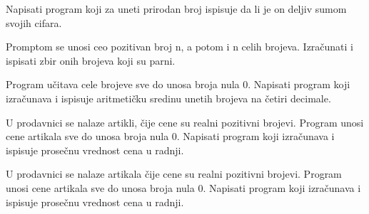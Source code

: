 \begin{primer}
Napisati program koji za uneti prirodan broj ispisuje da li
je on deljiv sumom svojih cifara.
\end{primer}

\begin{primer}
Promptom se unosi ceo pozitivan broj n, a potom i n celih
brojeva. Izračunati i ispisati zbir onih brojeva koji su parni.
\end{primer}

\begin{primer}
Program učitava cele brojeve sve do unosa broja nula 0.
Napisati program koji izračunava i ispisuje aritmetičku sredinu unetih brojeva na
četiri decimale.
\end{primer}

\begin{primer}
U prodavnici se nalaze artikli, čije cene su realni pozitivni
brojevi. Program unosi cene artikala sve do unosa broja nula 0. Napisati program
koji izračunava i ispisuje prosečnu vrednost cena u radnji.
\end{primer}

\begin{primer}
U prodavnici se nalaze artikala čije cene su realni pozitivni
brojevi. Program unosi cene artikala sve do unosa broja nula 0. Napisati program
koji izračunava i ispisuje prosečnu vrednost cena u radnji.
\end{primer}
